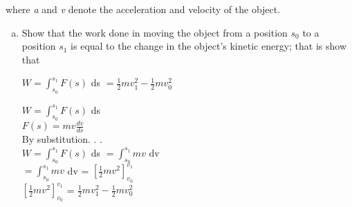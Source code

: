 \documentclass[paper=a4, fontsize=11pt]{scrartcl}
\numberwithin{equation}{section}
\numberwithin{figure}{section}
\numberwithin{table}{section}
\begin{document}
\begin{enumerate}[1.]
\begin{center}
	\end{center}
	\raggedright where \textit{a} and \textit{v} denote the acceleration and velocity of the object. 
		\begin{enumerate}[(a)]
			\item Show that the work done in moving the object from a position $s_{0}$ to a position $s_{1}$ is equal to the change in the object's kinetic energy; that is show that \\ 
			\begin{center} $W = \int_{s_{0}}^{s_{1}} F(s)$ ds $ = \frac{1}{2}mv_{1}^{2} - \frac{1}{2}mv_{0}^{2}$\\
			\end{center}
			$W = \int_{s_{0}}^{s_{1}} F(s)$ ds\\
			$F(s) = mv \frac{dv}{ds}$\\
			By substitution. . .\\
			$W = \int_{s_{0}}^{s_{1}} F(s)$ ds $= \int_{s_{0}}^{s_{1}}mv $ dv\\
			 $= \int_{s_{0}}^{s_{1}}mv $ dv = $[\frac{1}{2}mv^2]_{v_{0}}^{v_{1}}$\\
			 $[\frac{1}{2}mv^2]_{v_{0}}^{v_{1}}$ = $\frac{1}{2}mv_{1}^{2} - \frac{1}{2}mv_{0}^{2}$\\
			

\end{enumerate}
\end{enumerate}
\end{document}
